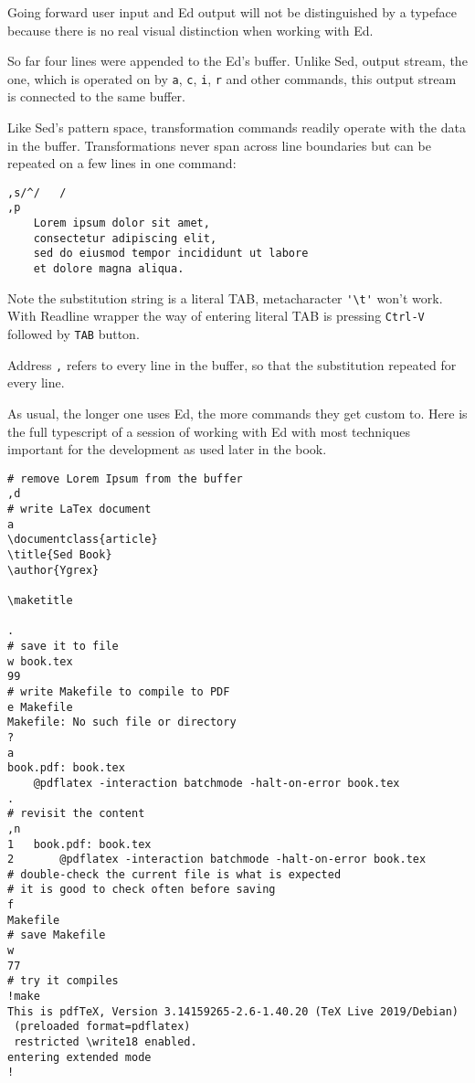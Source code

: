Going forward user input and Ed output will not be
distinguished by a typeface because there is no real
visual distinction when working with Ed.

So far four lines were appended to the Ed's buffer. Unlike Sed, output
stream, the one, which is operated on by \lstinline{a},
\lstinline{c}, \lstinline{i}, \lstinline{r} and other commands,
this output stream is connected to the same buffer.

Like Sed's pattern space, transformation commands readily
operate with the data in the buffer. Transformations never
span across line boundaries but can be repeated on a few
lines in one command:
\begin{lstlisting}
,s/^/	/
,p
	Lorem ipsum dolor sit amet,
	consectetur adipiscing elit,
	sed do eiusmod tempor incididunt ut labore
	et dolore magna aliqua.
\end{lstlisting}

Note the substitution string is a literal TAB, metacharacter
\lstinline{'\t'} won't work. With Readline wrapper the way
of entering literal TAB is pressing \lstinline{Ctrl-V} followed
by \lstinline{TAB} button.

Address \lstinline{,} refers to every line in the buffer, so that
the substitution repeated for every line.

As usual, the longer one uses Ed, the more commands they get custom to.
Here is the full typescript of a session of working with Ed with most
techniques important for the development as used later in the book.
\begin{lstlisting}
# remove Lorem Ipsum from the buffer
,d
# write LaTex document
a
\documentclass{article}
\title{Sed Book}
\author{Ygrex}

\maketitle

.
# save it to file
w book.tex
99
# write Makefile to compile to PDF
e Makefile
Makefile: No such file or directory
?
a
book.pdf: book.tex
	@pdflatex -interaction batchmode -halt-on-error book.tex
.
# revisit the content
,n
1	book.pdf: book.tex
2		@pdflatex -interaction batchmode -halt-on-error book.tex
# double-check the current file is what is expected
# it is good to check often before saving
f
Makefile
# save Makefile
w
77
# try it compiles
!make
This is pdfTeX, Version 3.14159265-2.6-1.40.20 (TeX Live 2019/Debian)
 (preloaded format=pdflatex)
 restricted \write18 enabled.
entering extended mode
!
\end{lstlisting}

